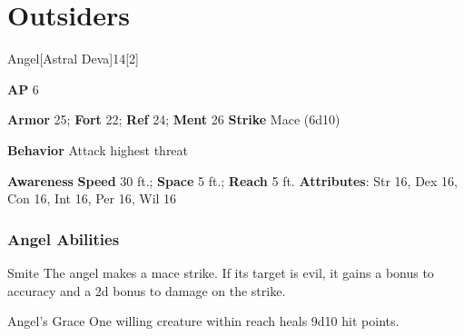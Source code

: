 \section{Outsiders}
\begin{monsection}{Angel}[Astral Deva]{14}[2]
\vspace{-1em}\vspace{-1em}
\begin{spellcontent}
\begin{spelltargetinginfo}
{\textbf{AP} 6}

\pari \textbf{Armor} 25;
\textbf{Fort} 22;
\textbf{Ref} 24;
\textbf{Ment} 26
\pari \textbf{Strike} Mace  (6d10)



\pari \textbf{Behavior} Attack highest threat
\end{spelltargetinginfo}
\end{spellcontent}

\begin{monsterfooter}
\pari \textbf{Awareness} 
\pari \textbf{Speed} 30 ft.;
\textbf{Space} 5 ft.;
\textbf{Reach} 5 ft.
\pari \textbf{Attributes}:
Str 16,
Dex 16,
Con 16,
Int 16,
Per 16,
Wil 16
\end{monsterfooter}
\end{monsection}


\subsubsection{Angel Abilities}

\begin{freeability}{Smite}
The angel makes a mace strike.
If its target is evil, it gains a  bonus to accuracy and a \plus2d bonus to damage on the strike.
\end{freeability}

\vspace{0.5em}
\begin{freeability}{Angel's Grace}
One willing creature within reach heals 9d10 hit points.
\end{freeability}

